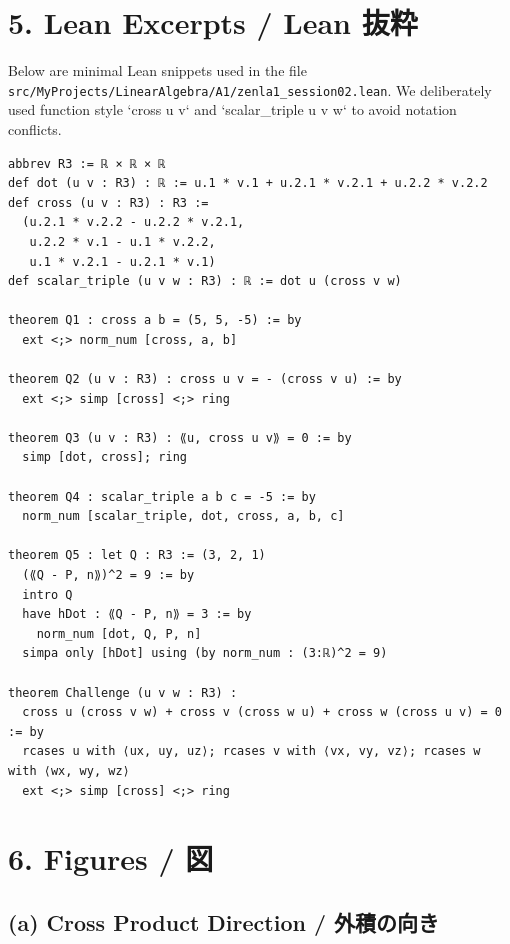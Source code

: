 \documentclass[12pt]{article}
\newcommand{\cross}{\times}
\begin{document}
\section*{5. Lean Excerpts / Lean 抜粋}
Below are minimal Lean snippets used in the file \texttt{src/MyProjects/LinearAlgebra/A1/zenla1\_session02.lean}. We deliberately used function style `cross u v` and `scalar_triple u v w` to avoid notation conflicts.

\begin{lstlisting}
abbrev R3 := ℝ × ℝ × ℝ
def dot (u v : R3) : ℝ := u.1 * v.1 + u.2.1 * v.2.1 + u.2.2 * v.2.2
def cross (u v : R3) : R3 :=
  (u.2.1 * v.2.2 - u.2.2 * v.2.1,
   u.2.2 * v.1 - u.1 * v.2.2,
   u.1 * v.2.1 - u.2.1 * v.1)
def scalar_triple (u v w : R3) : ℝ := dot u (cross v w)

theorem Q1 : cross a b = (5, 5, -5) := by
  ext <;> norm_num [cross, a, b]

theorem Q2 (u v : R3) : cross u v = - (cross v u) := by
  ext <;> simp [cross] <;> ring

theorem Q3 (u v : R3) : ⟪u, cross u v⟫ = 0 := by
  simp [dot, cross]; ring

theorem Q4 : scalar_triple a b c = -5 := by
  norm_num [scalar_triple, dot, cross, a, b, c]

theorem Q5 : let Q : R3 := (3, 2, 1)
  (⟪Q - P, n⟫)^2 = 9 := by
  intro Q
  have hDot : ⟪Q - P, n⟫ = 3 := by
    norm_num [dot, Q, P, n]
  simpa only [hDot] using (by norm_num : (3:ℝ)^2 = 9)

theorem Challenge (u v w : R3) :
  cross u (cross v w) + cross v (cross w u) + cross w (cross u v) = 0 := by
  rcases u with ⟨ux, uy, uz⟩; rcases v with ⟨vx, vy, vz⟩; rcases w with ⟨wx, wy, wz⟩
  ext <;> simp [cross] <;> ring
\end{lstlisting}

\section*{6. Figures / 図}
\subsection*{(a) Cross Product Direction / 外積の向き}
\begin{center}
\end{center}
\end{document}
